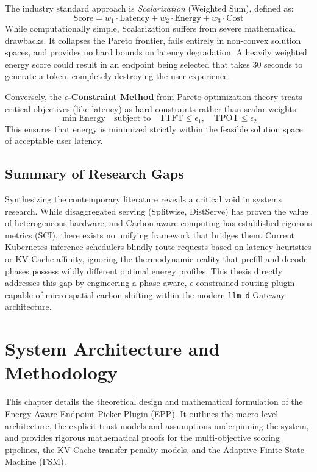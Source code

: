 \documentclass[12pt,a4paper,oneside]{report}
\begin{document}
The industry standard approach is \textit{Scalarization} (Weighted Sum), defined as:
\[ \text{Score} = w_1 \cdot \text{Latency} + w_2 \cdot \text{Energy} + w_3 \cdot \text{Cost} \]
While computationally simple, Scalarization suffers from severe mathematical drawbacks. It collapses the Pareto frontier, fails entirely in non-convex solution spaces, and provides no hard bounds on latency degradation. A heavily weighted energy score could result in an endpoint being selected that takes 30 seconds to generate a token, completely destroying the user experience.

Conversely, the \textbf{\(\epsilon\)-Constraint Method} from Pareto optimization theory treats critical objectives (like latency) as hard constraints rather than scalar weights:
\[ \min \text{Energy} \quad \text{subject to} \quad \text{TTFT} \leq \epsilon_1, \quad \text{TPOT} \leq \epsilon_2 \]
This ensures that energy is minimized strictly within the feasible solution space of acceptable user latency.

\section{Summary of Research Gaps}
\label{sec:lit_gaps}

Synthesizing the contemporary literature reveals a critical void in systems research. While disaggregated serving (Splitwise, DistServe) has proven the value of heterogeneous hardware, and Carbon-aware computing has established rigorous metrics (SCI), there exists no unifying framework that bridges them. Current Kubernetes inference schedulers blindly route requests based on latency heuristics or KV-Cache affinity, ignoring the thermodynamic reality that prefill and decode phases possess wildly different optimal energy profiles. This thesis directly addresses this gap by engineering a phase-aware, \(\epsilon\)-constrained routing plugin capable of micro-spatial carbon shifting within the modern \texttt{llm-d} Gateway architecture.


\chapter{System Architecture and Methodology}
\label{ch:system_architecture}

This chapter details the theoretical design and mathematical formulation of the Energy-Aware Endpoint Picker Plugin (EPP). It outlines the macro-level architecture, the explicit trust models and assumptions underpinning the system, and provides rigorous mathematical proofs for the multi-objective scoring pipelines, the KV-Cache transfer penalty models, and the Adaptive Finite State Machine (FSM).
\end{document}
